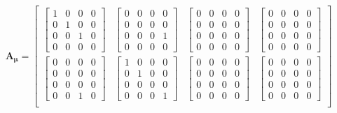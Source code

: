 \documentclass[twocolumn,10pt]{asme2ej}
\begin{document}
\begin{equation}
    \bm{A_{\mu}} = \begin{bmatrix}
    \begin{bmatrix} 1 & 0 & 0 & 0 \\ 0 & 1 & 0 & 0 \\ 0 & 0 & 1 & 0 \\ 0 & 0 & 0 & 0 \end{bmatrix} &
    \begin{bmatrix} 0 & 0 & 0 & 0 \\ 0 & 0 & 0 & 0 \\ 0 & 0 & 0 & 1 \\ 0 & 0 & 0 & 0 \end{bmatrix} &
    \begin{bmatrix} 0 & 0 & 0 & 0 \\ 0 & 0 & 0 & 0 \\ 0 & 0 & 0 & 0 \\ 0 & 0 & 0 & 0 \end{bmatrix} &
    \begin{bmatrix} 0 & 0 & 0 & 0 \\ 0 & 0 & 0 & 0 \\ 0 & 0 & 0 & 0 \\ 0 & 0 & 0 & 0 \end{bmatrix} \\
      \begin{bmatrix} 0 & 0 & 0 & 0 \\ 0 & 0 & 0 & 0 \\ 0 & 0 & 0 & 0 \\ 0 & 0 & 1 & 0 \end{bmatrix} &
      \begin{bmatrix} 1 & 0 & 0 & 0 \\ 0 & 1 & 0 & 0 \\ 0 & 0 & 0 & 0 \\ 0 & 0 & 0 & 1 \end{bmatrix} &
      \begin{bmatrix} 0 & 0 & 0 & 0 \\ 0 & 0 & 0 & 0 \\ 0 & 0 & 0 & 0 \\ 0 & 0 & 0 & 0 \end{bmatrix} &
      \begin{bmatrix} 0 & 0 & 0 & 0 \\ 0 & 0 & 0 & 0 \\ 0 & 0 & 0 & 0 \\ 0 & 0 & 0 & 0 \end{bmatrix} \\

\end{bmatrix}
\end{equation}
\end{document}
